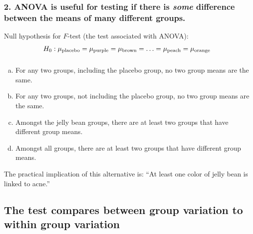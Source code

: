 \documentclass[11pt,containsverbatim,handout,xcolor=xelatex,dvipsnames,table]{beamer}
\newcommand{\solnMult}[1]{#1}
\begin{document}

\begin{frame}
\frametitle{2. ANOVA is useful for testing if there is \emph{some} difference
between the means of many different groups.}

Null hypothesis for $F$-test (the test associated with ANOVA):
\[ H_0: \mu_{\textmd{placebo}} = \mu_{\textmd{purple}} = \mu_{\textmd{brown}} =
\ldots = \mu_{\textmd{peach}} = \mu_{\textmd{orange}} \]

\end{frame}


\begin{frame}
\frametitle{}


\begin{enumerate}[(a)]
\item For any two groups, including the placebo group, no two group means are the same.
\item For any two groups, not including the placebo group, no two group means are the
same.
\item Amongst the jelly bean groups, there are at least two groups that have different group means.
\item \solnMult{Amongst all groups, there are at least two groups that have different group means.}
\end{enumerate}

\pause

The practical implication of this alternative is: ``At least one color of
jelly bean is linked to acne.''

\end{frame}


\subsection{The test compares between group variation to within group variation}
\label{mi3}

\end{document}
